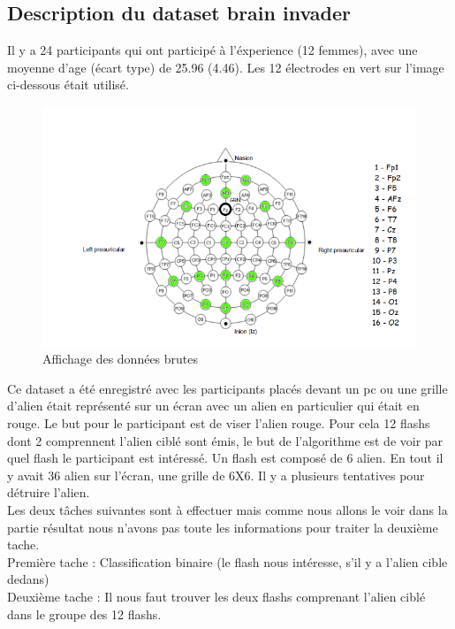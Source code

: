 \documentclass{article}[12pt]
\begin{document}
\subsection{Description du dataset brain invader}
Il y a 24 participants qui ont participé à l’éxperience (12 femmes), avec une moyenne d'age (écart type) de 25.96 (4.46). Les 12 électrodes en vert sur l'image ci-dessous était utilisé.
\begin{figure}[H]
\begin{center}
\includegraphics[scale=0.4]{images/situation_capteur.png}
\end{center}
\caption{Affichage des données brutes}
\end{figure}

Ce dataset a été enregistré avec les participants placés devant un pc ou une grille d'alien était représenté sur un écran avec un alien en particulier qui était en rouge. Le but pour le participant est de viser l'alien rouge. Pour cela 12 flashs dont 2 comprennent l'alien ciblé sont émis, le but de l'algorithme est de voir par quel flash le participant est intéressé. Un flash est composé de 
6 alien. En tout il y avait 36 alien sur l’écran, une grille de 6X6. Il y a plusieurs tentatives pour détruire l'alien.\\
Les deux tâches suivantes sont à effectuer mais comme nous allons le voir dans la partie résultat nous n'avons pas toute les informations pour traiter la deuxième tache.\\
Première tache : Classification binaire (le flash nous intéresse, s'il y a l'alien cible dedans)\\
Deuxième tache : Il nous faut trouver les deux flashs comprenant l'alien ciblé dans le groupe des 12 flashs.\\
\end{document}

